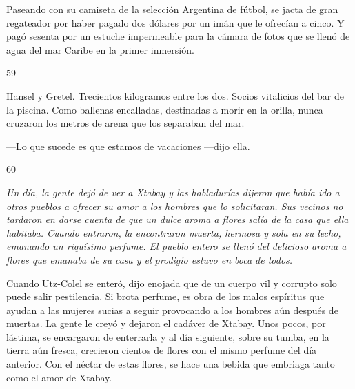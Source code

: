 \documentclass[12pt,twoside,openright,a5paper]{book}
\begin{document}
\nopagebreak

\vspace{0.5cm}

\nopagebreak

Paseando con su camiseta de la selección Argentina de fútbol, se jacta de
gran regateador por haber pagado dos dólares por un imán que le ofrecían
a cinco. Y pagó sesenta por un estuche impermeable para la cámara de fotos
que se llenó de agua del mar Caribe en la primer inmersión.

\vspace{0.5cm}

\hrulefill \hspace{0.1cm}\decofourleft\hspace{0.2cm} 59 \hspace{0.2cm}\decofourright \hspace{0.1cm}\hrulefill

\nopagebreak

\vspace{0.5cm}

\nopagebreak

Hansel y Gretel. Trecientos kilogramos entre los dos. Socios vitalicios del bar de la
piscina. Como ballenas encalladas, destinadas a morir en la orilla, nunca
cruzaron los metros de arena que los separaban del mar.

---Lo que sucede es que estamos de vacaciones ---dijo ella.

\vspace{0.5cm}

\hrulefill \hspace{0.1cm}\decofourleft\hspace{0.2cm} 60 \hspace{0.2cm}\decofourright \hspace{0.1cm}\hrulefill

\nopagebreak

\vspace{0.5cm}

\nopagebreak

{\em Un día, la gente dejó de ver a Xtabay y las habladurías dijeron
que había ido a otros pueblos a ofrecer su amor a los hombres que lo
solicitaran. Sus vecinos no tardaron en darse cuenta de que un dulce aroma
a flores salía de la casa que ella habitaba. Cuando entraron, la encontraron
muerta, hermosa y sola en su lecho, emanando un riquísimo perfume. El pueblo
entero se llenó del delicioso aroma a flores que emanaba de su casa y el
prodigio estuvo en boca de todos.

Cuando Utz-Colel se enteró, dijo enojada que de un cuerpo vil y corrupto solo
puede salir pestilencia. Si brota perfume, es obra de los malos espíritus
que ayudan a las mujeres sucias a seguir provocando a los hombres aún
después de muertas. La gente le creyó y dejaron el cadáver de Xtabay. Unos
pocos, por lástima, se encargaron de enterrarla y al día siguiente,
sobre su tumba, en la tierra aún fresca, crecieron cientos de flores con
el mismo perfume del día anterior. Con el néctar de estas flores, se hace
una bebida que embriaga tanto como el amor de Xtabay.}
\end{document}
